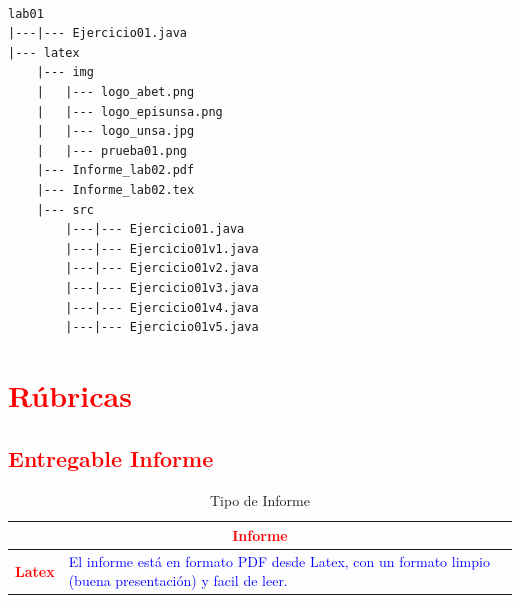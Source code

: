 \documentclass{article}
\begin{document}
\begin{lstlisting}[style=ascii-tree]

lab01
|---|--- Ejercicio01.java
|--- latex
    |--- img
    |   |--- logo_abet.png
    |   |--- logo_episunsa.png
    |   |--- logo_unsa.jpg
    |   |--- prueba01.png
    |--- Informe_lab02.pdf
    |--- Informe_lab02.tex
    |--- src
        |---|--- Ejercicio01.java
        |---|--- Ejercicio01v1.java
        |---|--- Ejercicio01v2.java
        |---|--- Ejercicio01v3.java
        |---|--- Ejercicio01v4.java
        |---|--- Ejercicio01v5.java

\end{lstlisting}    

	\section{\textcolor{red}{Rúbricas}}
	
	\subsection{\textcolor{red}{Entregable Informe}}
	\begin{table}[H]
		\caption{Tipo de Informe}
		\setlength{\tabcolsep}{0.5em} %
		{\renewcommand{\arraystretch}{1.5}%
		\begin{tabular}{|p{3cm}|p{12cm}|}
			\hline
			\multicolumn{2}{|c|}{\textbf{\textcolor{red}{Informe}}}  \\
			\hline 
			\textbf{\textcolor{red}{Latex}} & \textcolor{blue}{El informe está en formato PDF desde Latex,  con un formato limpio (buena presentación) y facil de leer.}   \\ 
			\hline 
			
			
		\end{tabular}
	}
	\end{table}
	
	\clearpage
 
\end{document}
